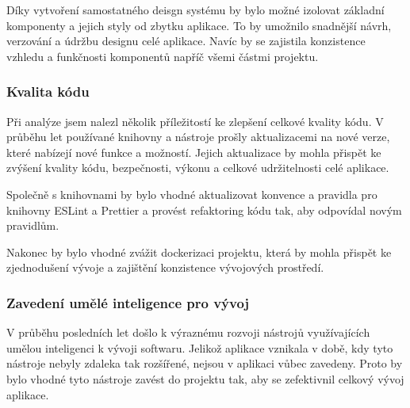 Díky vytvoření samostatného deisgn systému by bylo možné izolovat základní komponenty a jejich styly od zbytku aplikace. To by umožnilo snadnější návrh, verzování a údržbu designu celé aplikace. Navíc by se zajistila konzistence vzhledu a funkčnosti komponentů napříč všemi částmi projektu.

\subsubsection{Kvalita kódu}


Při analýze jsem nalezl několik příležitostí ke zlepšení celkové kvality kódu. V průběhu let používané knihovny a nástroje prošly aktualizacemi na nové verze, které nabízejí nové funkce a možností. Jejich aktualizace by mohla přispět ke zvýšení kvality kódu, bezpečnosti, výkonu a celkové udržitelnosti celé aplikace.

Společně s knihovnami by bylo vhodné aktualizovat konvence a pravidla pro knihovny ESLint a Prettier a provést refaktoring kódu tak, aby odpovídal novým pravidlům.

Nakonec by bylo vhodné zvážit dockerizaci projektu, která by mohla přispět ke zjednodušení vývoje a zajištění konzistence vývojových prostředí.

\subsubsection{Zavedení umělé inteligence pro vývoj}

V průběhu posledních let došlo k výraznému rozvoji nástrojů využívajících umělou inteligenci k vývoji softwaru. Jelikož aplikace vznikala v době, kdy tyto nástroje nebyly zdaleka tak rozšířené, nejsou v aplikaci vůbec zavedeny. Proto by bylo vhodné tyto nástroje zavést do projektu tak, aby se zefektivnil celkový vývoj aplikace.



